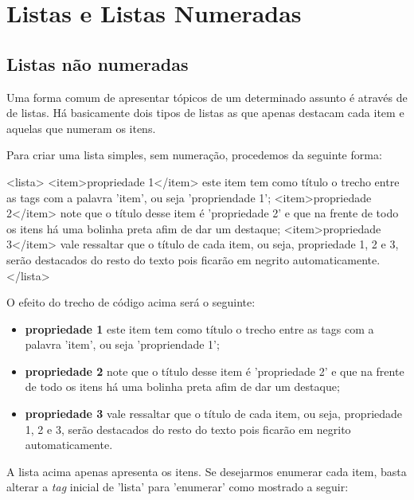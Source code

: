\newpage \chapter{Listas e Listas Numeradas}\setcounter{SteP}{1}
\label{sec:listas}

\section{Listas não numeradas}\setcounter{SteP}{1}

Uma forma comum de apresentar tópicos de um determinado assunto é através de
de listas. Há basicamente dois tipos de listas as que apenas destacam cada item
e aquelas que numeram os itens.

Para criar uma lista simples, sem numeração, procedemos da seguinte forma:

\begin{BoxVerbatim}
    <lista>
        <item>propriedade 1</item> este item tem como título o trecho 
            entre as tags com a palavra 'item', ou seja 'propriendade 1';
        <item>propriedade 2</item> note que o título desse item é 
            'propriedade 2' e que na frente de todo os itens há uma 
            bolinha preta afim de dar um destaque;
        <item>propriedade 3</item> vale ressaltar que o título de cada
            item, ou seja, propriedade 1, 2 e 3, serão destacados do resto 
            do texto pois ficarão em negrito automaticamente.
    </lista>
\end{BoxVerbatim}

O efeito do trecho de código acima será o seguinte:

\begin{itemize}
	\item{\bf propriedade 1} este item tem como título o trecho entre as tags
							com a palavra 'item', ou seja 'propriendade 1';
	\item{\bf propriedade 2} note que o título desse item é 'propriedade 2' e
							que na frente de todo os itens há uma bolinha
							preta afim de dar um destaque;
	\item{\bf propriedade 3} vale ressaltar que o título de cada item, ou
							seja, propriedade 1, 2 e 3, serão destacados do
							resto do texto pois ficarão em negrito
							automaticamente.
\end{itemize}

A lista acima apenas apresenta os itens. Se desejarmos enumerar cada item, basta
alterar a {\it tag} inicial de 'lista' para 'enumerar' como mostrado a
seguir:

